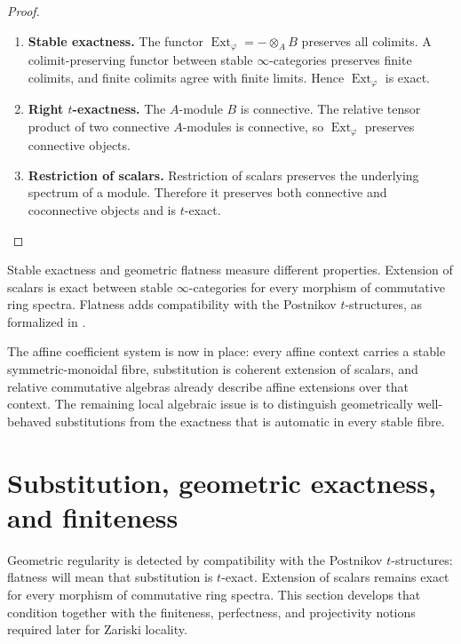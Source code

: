 \begin{proof}
\leavevmode
\begin{enumerate}[label=\textup{(\arabic*)}]
    \item \textbf{Stable exactness.}
    The functor \(\operatorname{Ext}_{\varphi}=-\otimes_AB\) preserves all colimits. A
    colimit-preserving functor between stable \(\infty\)-categories preserves
    finite colimits, and finite colimits agree with finite limits. Hence
    \(\operatorname{Ext}_{\varphi}\) is exact.

    \item \textbf{Right $t$-exactness.}
    The \(A\)-module \(B\) is connective. The relative tensor product of two
    connective \(A\)-modules is connective, so \(\operatorname{Ext}_{\varphi}\) preserves connective
    objects.

    \item \textbf{Restriction of scalars.}
    Restriction of scalars preserves the underlying spectrum of a module.
    Therefore it preserves both connective and coconnective objects and is
    \(t\)-exact.
\end{enumerate}
\end{proof}

\begin{remark}
\label{rem:stable-exactness-not-flatness}
Stable exactness and geometric flatness measure different properties.
Extension of scalars is exact between stable \(\infty\)-categories for every
morphism of commutative ring spectra. Flatness adds compatibility with the
Postnikov \(t\)-structures, as formalized in
.
\end{remark}

The affine coefficient system is now in place: every affine context carries a
stable symmetric-monoidal fibre, substitution is coherent extension of
scalars, and relative commutative algebras already describe affine extensions
over that context. The remaining local algebraic issue is to distinguish
geometrically well-behaved substitutions from the exactness that is automatic
in every stable fibre.

\section{Substitution, geometric exactness, and finiteness}
\label{sec:spectral-flatness-finiteness}

Geometric regularity is detected by compatibility with the Postnikov
\(t\)-structures: flatness will mean that substitution is \(t\)-exact.
Extension of scalars remains exact for every morphism of commutative ring
spectra. This section develops
that condition together with the finiteness, perfectness, and projectivity
notions required later for Zariski locality.

